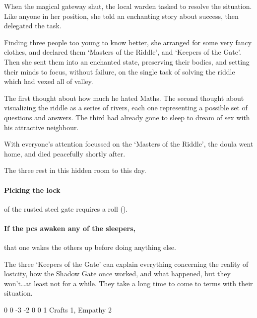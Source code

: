 \begin{exampletext}
  When the magical gateway shut, the local \gls{warden} tasked  to resolve the situation.
  Like anyone in her position, she told an enchanting story about success, then delegated the task.

  Finding three people too young to know better, she arranged for some very fancy clothes, and declared them `Masters of the Riddle', and `Keepers of the Gate'.
  Then she sent them into an enchanted state, preserving their bodies, and setting their minds to focus, without failure, on the single task of solving the riddle which had vexed all of \gls{valley}.

  The first thought about how much he hated Maths.
  The second thought about visualizing the riddle as a series of rivers, each one representing a possible set of questions and answers.
  The third had already gone to sleep to dream of sex with his attractive neighbour.

  With everyone's attention focussed on the `Masters of the Riddle', the \gls{doula} went home, and died peacefully shortly after.

  The three rest in this hidden room to this day.
\end{exampletext}

\paragraph{Picking the lock}
of the rusted steel gate requires a  roll (\tn[16]).

\paragraph{If the \glspl{pc} awaken any of the sleepers,}
that one wakes the others up before doing anything else.

The three `Keepers of the Gate' can explain everything concerning the reality of \gls{lostcity}, how the Shadow Gate once worked, and what happened, but they won't\ldots at least not for a while.
They take a long time to come to terms with their situation.

\setcounter{Intelligence}{-2}
{0}%
{0}%
{{-3}%
{-2}%
{0}}%
{0}%
{1}%
{Crafts 1, Empathy 2}%
{\Dagger}%
{}

